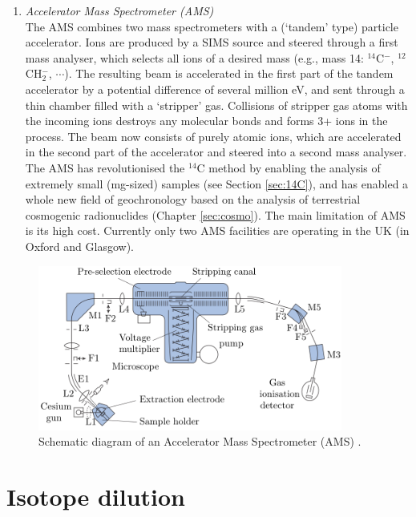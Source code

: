 \documentclass{book}
\newif\ifpdf
\begin{document}
\begin{enumerate}
\item{\emph{Accelerator Mass Spectrometer (AMS)}}\\ The AMS combines
  two mass spectrometers with a (`tandem' type) particle accelerator.
  Ions are produced by a SIMS source and steered through a first mass
  analyser, which selects all ions of a desired mass (e.g., mass 14:
  $^{14}$C$^-$, ${}^{12}$CH$_2^-$, $\cdots$). The resulting beam is
  accelerated in the first part of the tandem accelerator by a
  potential difference of several million eV, and sent through a thin
  chamber filled with a `stripper' gas. Collisions of stripper gas
  atoms with the incoming ions destroys any molecular bonds and forms
  3+ ions in the process. The beam now consists of purely atomic ions,
  which are accelerated in the second part of the accelerator and
  steered into a second mass analyser. The AMS has revolutionised the
  $^{14}$C method by enabling the analysis of extremely small
  (mg-sized) samples (see Section \ref{sec:14C}), and has enabled a
  whole new field of geochronology based on the analysis of
  terrestrial cosmogenic radionuclides (Chapter \ref{sec:cosmo}). The
  main limitation of AMS is its high cost. Currently only two AMS
  facilities are operating in the UK (in Oxford and Glasgow).
\end{enumerate}

\begin{figure}[!ht]
  \centering
  \ifpdf
  \def\svgwidth{\textwidth}
  
  \else
  \includegraphics[width=10cm]{AMS.png}
  \fi
  \caption{Schematic diagram of an Accelerator Mass Spectrometer (AMS)
    \citep[modified from][]{allegre2008}.}
  \label{fig:AMS}
\end{figure}

\section{Isotope dilution}
\label{sec:isotope-dilution}
\end{document}
